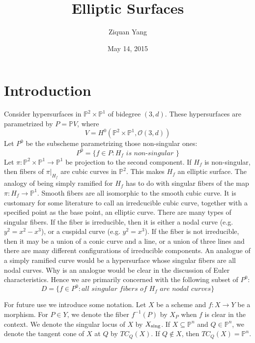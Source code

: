 \documentclass[12pt]{article}
\theoremstyle{plain}
\theoremstyle{definition}
\newcommand{\IP}{\mathbb{P}}
\newcommand{\sO}{\mathcal{O}}
\newcommand{\sing}{{\rm sing}}
\newcommand{\<}{\langle}
\renewcommand{\>}{\rangle}
\begin{document}
%

\title{Elliptic Surfaces}
\author{Ziquan Yang}


\date{May 14, 2015}

\maketitle
 

\setcounter{section}{0}

\section{Introduction}
Consider hypersurfaces in $\IP^2 \times \IP^1$ of bidegree $(3, d)$. These hypersurfaces are parametrized by $P = \IP V$, where
$$ V = H^0 ( \IP^2 \times \IP^1, \sO(3, d) ) $$
Let $P^0$ be the subscheme parametrizing those non-singular ones:
$$ P^0 = \{ f \in P : H_f \textit{ is non-singular }\} $$
Let $\pi : \IP^2 \times \IP^1 \to \IP^1$ be projection to the second component. If $H_f$ is non-singular, then fibers of $\pi|_{H_f}$ are cubic curves in $\IP^2$. This makes $H_f$ an elliptic surface. The analogy of being simply ramified for $H_f$ has to do with singular fibers of the map $\pi : H_f \to \IP^1$. Smooth fibers are all isomorphic to the smooth cubic curve. It is customary for some literature to call an irredcucible cubic curve, together with a specified point as the base point, an elliptic curve. There are many types of singular fibers. If the fiber is irreducible, then it is either a nodal curve (e.g. $y^2 = x^2 - x^3$), or a cuspidal curve (e.g. $y^2 = x^3$). If the fiber is not irreducible, then it may be a union of a conic curve and a line, or a union of three lines and there are many different configurations of irreducible components. 
An analogue of a simply ramified curve would be a hypersurface whose singular fibers are all nodal curves. Why is an analogue would be clear in the discussion of Euler characteristics. Hence we are primarily concerned with the following subset of $P^0$: 
$$ D = \{ f \in P^0 : \textit{all singular fibers of $H_f$ are nodal curves} \}$$

For future use we introduce some notation. Let $X$ be a scheme and $f : X \to Y$ be a morphism. For $P \in Y$, we denote the fiber $f^{-1}(P)$ by $X_P$ when $f$ is clear in the context. We denote the singular locus of $X$ by $X_\sing$. If $X \subseteq \IP^n$ and $Q \in \IP^n$, we denote the tangent cone of $X$ at $Q$ by $TC_Q(X)$. If $Q \not\in X$, then $TC_Q(X) = \IP^n$. 
\end{document}
